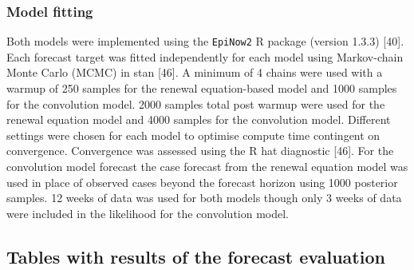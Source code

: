 \documentclass[10pt,letterpaper]{article}
\begin{document}
\hypertarget{model-fitting}{%
\subsubsection{Model fitting}\label{model-fitting}}

Both models were implemented using the \texttt{EpiNow2} R package
(version 1.3.3) {[}40{]}. Each forecast target was fitted independently
for each model using Markov-chain Monte Carlo (MCMC) in stan {[}46{]}. A
minimum of 4 chains were used with a warmup of 250 samples for the
renewal equation-based model and 1000 samples for the convolution model.
2000 samples total post warmup were used for the renewal equation model
and 4000 samples for the convolution model. Different settings were
chosen for each model to optimise compute time contingent on
convergence. Convergence was assessed using the R hat diagnostic
{[}46{]}. For the convolution model forecast the case forecast from the
renewal equation model was used in place of observed cases beyond the
forecast horizon using 1000 posterior samples. 12 weeks of data was used
for both models though only 3 weeks of data were included in the
likelihood for the convolution model.

\clearpage

\hypertarget{tables-with-results-of-the-forecast-evaluation}{%
\subsection{Tables with results of the forecast
evaluation}\label{tables-with-results-of-the-forecast-evaluation}}
\end{document}
